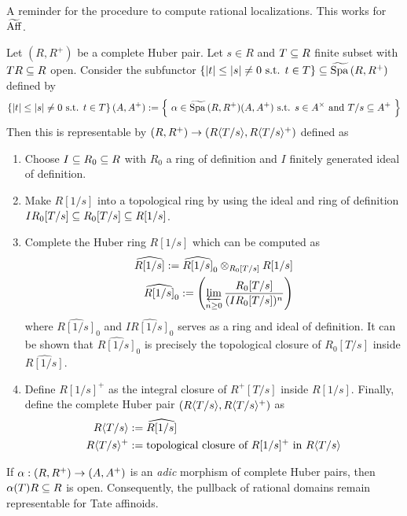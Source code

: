 \documentclass{article}
\begin{document}
A reminder for the procedure to compute rational localizations.
This works for $\widetilde{\mathrm{Aff}}$.
\begin{prop}
  Let $(R , R^+)$ be a complete Huber pair.
  Let $s \in R$ and $T \subseteq R$ finite subset with $TR \subseteq R$ open.
  Consider the subfunctor 
  $\left\{\left\vert t \right\vert \leq \left\vert s \right\vert \neq 0 \text{ s.t. } t \in T\right\} \subseteq \widetilde{\mathrm{Spa}\,}(R , R^+)$
  defined by \[
    \left\{\left\vert t \right\vert \leq \left\vert s \right\vert \neq 0 \text{ s.t. } t \in T\right\}(A , A^+) := \left\{
      \text{ $\alpha \in \widetilde{\mathrm{Spa}\,}(R , R^+)(A , A^+) 
      \text{ s.t. } s \in A^\times$ and
      $T / s \subseteq A^+$
      }
    \right\}
  \]
  Then this is representable by $(R , R^+) \to (R\langle T / s\rangle , R\langle T / s\rangle^+)$
  defined as 
  \begin{enumerate}
    \item Choose $I \subseteq R_0 \subseteq R$ with $R_0$ a ring of definition
    and $I$ finitely generated ideal of definition.
    \item Make $R[1 / s]$ into a topological ring by 
    using the ideal and ring of definition 
    $I R_0 [T / s] \subseteq R_0[T / s] \subseteq R[1 / s]$.
    \item Complete the Huber ring $R[1 / s]$ 
    which can be computed as \begin{align*}
      \widehat{R[1 / s]} := 
      \widehat{R[1/s]}_0 \otimes_{R_0[T / s]} R[1 / s] \\
      \widehat{R[1/s]}_0 := \left(\varprojlim_{n \geq 0} \frac{R_0[T / s]}{(I R_0[T / s])^n}\right) 
    \end{align*}
    where $\widehat{R[1/s]}_0$ and $I \widehat{R[1/s]}_0$ serves as
    a ring and ideal of definition.
    It can be shown that $\widehat{R[1/s]}_0$
    is precisely the topological closure of $R_0[T/s]$ inside 
    $\widehat{R[1 / s]}$.
    \item Define $R[1 / s]^+$ as the integral closure of
    $R^+[T / s]$ inside $R[1 / s]$.
    Finally, define the complete Huber pair $(R\langle T / s\rangle , R\langle T / s\rangle^+)$
    as \begin{align*}
      R\langle T / s\rangle &:= \widehat{R[1 / s]} \\
      R\langle T / s\rangle^+ &:= \text{topological closure of $R[1 / s]^+$ in $R\langle T / s\rangle$}
    \end{align*}
  \end{enumerate}
  \cite[Theorem 3.1.3]{SW20}

  If $\alpha : (R , R^+) \to (A , A^+)$ is an \emph{adic} morphism
  of complete Huber pairs,
  then $\alpha(T) R \subseteq R$ is open.
  \cite[Prop. III.2.5.(iv)]{Mor19}
  Consequently, the pullback of rational domains remain representable
  for Tate affinoids.
\end{prop} 
\end{document}
